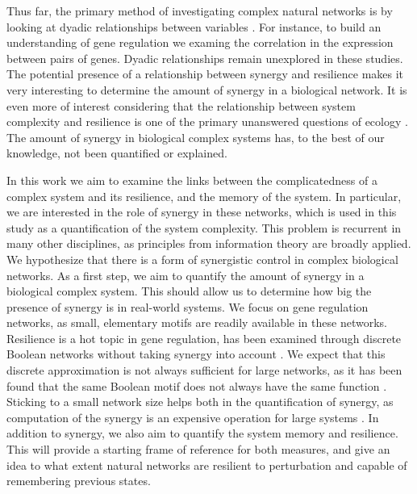 \documentclass[../main.tex]{subfiles}
\begin{document}
Thus far, the primary method of investigating complex natural networks is by looking at dyadic relationships between variables \cite{}. %
For instance, to build an understanding of gene regulation we examing the correlation in the expression between pairs of genes.
Dyadic relationships remain unexplored in these studies. 
The potential presence of a relationship between synergy and resilience makes it very interesting to determine the amount of synergy in a biological network. 
It is even more of interest considering that the relationship between system complexity and resilience is one of the primary unanswered questions of ecology \cite{}.
The amount of synergy in biological complex systems has, to the best of our knowledge, not been quantified or explained.

In this work we aim to examine the links between the complicatedness of a complex system and its resilience, and the memory of the system.
In particular, we are interested in the role of synergy in these networks, which is used in this study as a quantification of the system complexity.
This problem is recurrent in many other disciplines, as principles from information theory are broadly applied.
We hypothesize that there is a form of synergistic control in complex biological networks.
As a first step, we aim to quantify the amount of synergy in a biological complex system.
This should allow us to determine how big the presence of synergy is in real-world systems.
We focus on gene regulation networks, as small, elementary motifs are readily available in these networks.
Resilience is a hot topic in gene regulation, has been examined through discrete Boolean networks without taking synergy into account \cite{peixoto2012emergence}.
We expect that this discrete approximation is not always sufficient for large networks, as it has been found that the same Boolean motif does not always have the same function \cite{ingram2006network}.
Sticking to a small network size helps both in the quantification of synergy, as computation of the synergy is an expensive operation for large systems \cite{jointpdf}.
In addition to synergy, we also aim to quantify the system memory and resilience.
This will provide a starting frame of reference for both measures, and give an idea to what extent natural networks are resilient to perturbation and capable of remembering previous states.
\end{document}
